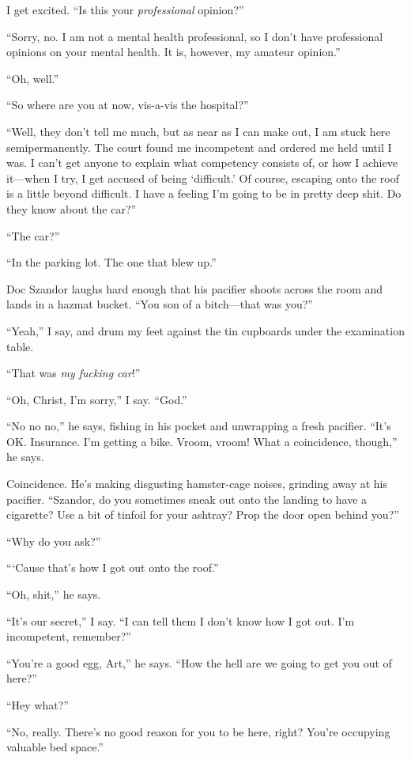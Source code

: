 I get excited. “Is this your \emph{professional} opinion?”

“Sorry, no. I am not a mental health professional, so I don’t have
professional opinions on your mental health. It is, however, my
amateur opinion.”

“Oh, well.”

“So where are you at now, vis-a-vis the hospital?”

“Well, they don’t tell me much, but as near as I can make out, I am
stuck here semipermanently. The court found me incompetent and
ordered me held until I was. I can’t get anyone to explain what
competency consists of, or how I achieve it—when I try, I get
accused of being ‘difficult.’ Of course, escaping onto the roof is
a little beyond difficult. I have a feeling I’m going to be in
pretty deep shit. Do they know about the car?”

“The car?”

“In the parking lot. The one that blew up.”

Doc Szandor laughs hard enough that his pacifier shoots across the
room and lands in a hazmat bucket. “You son of a bitch—that was
you?”

“Yeah,” I say, and drum my feet against the tin cupboards under the
examination table.

“That was \emph{my fucking car}!”

“Oh, Christ, I’m sorry,” I say. “God.”

“No no no,” he says, fishing in his pocket and unwrapping a fresh
pacifier. “It’s OK. Insurance. I’m getting a bike. Vroom, vroom!
What a coincidence, though,” he says.

Coincidence. He’s making disgusting hamster-cage noises, grinding
away at his pacifier. “Szandor, do you sometimes sneak out onto the
landing to have a cigarette? Use a bit of tinfoil for your ashtray?
Prop the door open behind you?”

“Why do you ask?”

“‘Cause that’s how I got out onto the roof.”

“Oh, shit,” he says.

“It’s our secret,” I say. “I can tell them I don’t know how I got
out. I’m incompetent, remember?”

“You’re a good egg, Art,” he says. “How the hell are we going to
get you out of here?”

“Hey what?”

“No, really. There’s no good reason for you to be here, right?
You’re occupying valuable bed space.”

